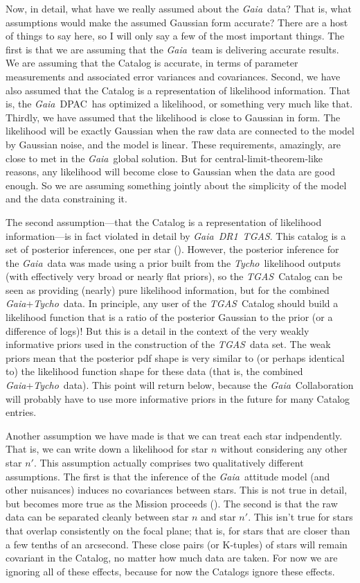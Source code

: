 \documentclass[12pt, modern]{aastex62h}
\newcommand{\acronym}[1]{{\small{#1}}}
\newcommand{\Gaia}{\textsl{Gaia}}
\newcommand{\Tycho}{\textsl{Tycho}}
\newcommand{\DRone}{\textsl{\acronym{DR1}}}
\newcommand{\TGAS}{\textsl{\acronym{TGAS}}}
\newcommand{\DPAC}{{\acronym{DPAC}}}
\begin{document}
Now, in detail, what have we really assumed about the \Gaia\ data?
That is, what assumptions would make the assumed Gaussian form accurate?
There are a host of things to say here, so I will only say a few of the
most important things.
The first is that we are assuming that the \Gaia\ team is delivering
accurate results.
We are assuming that the Catalog is accurate, in terms of parameter
measurements and associated error variances and covariances.
Second, we have also assumed that the Catalog is a representation of likelihood
information.
That is, the \Gaia\ \DPAC\ has optimized a likelihood, or something very much
like that.
Thirdly, we have assumed that the likelihood is close to Gaussian in form.
The likelihood will be exactly Gaussian when the raw data are connected
to the model by Gaussian noise, and the model is linear.
These requirements, amazingly, are close to met in the \Gaia\ global solution.
But for central-limit-theorem-like reasons, any likelihood will become close
to Gaussian when the data are good enough.
So we are assuming something jointly about the simplicity of the model and
the data constraining it.

The second assumption---that the Catalog is a representation of likelihood
information---is in fact violated in detail by \Gaia\ \DRone\ \TGAS.
This catalog is a set of posterior inferences, one per star (\citealt{michalik, dr1}).
However, the posterior inference for the \Gaia\ data was made using a prior
built from the \Tycho\ likelihood outputs (with effectively very broad
or nearly flat priors),
so the \TGAS\ Catalog can be seen as providing (nearly) pure likelihood information,
but for the combined \Gaia +\Tycho\ data.
In principle, any user of the \TGAS\ Catalog should build a likelihood function
that is a ratio of the posterior Gaussian to the prior (or a difference
of logs)!
But this is a detail in the context of the very weakly informative priors
used in the construction of the \TGAS\ data set.
The weak priors mean that the posterior pdf shape is very similar to
(or perhaps identical to) the likelihood
function shape for these data (that is, the combined \Gaia +\Tycho\ data).
This point will return below, because the \Gaia\ Collaboration will probably have to use
more informative priors in the future for many Catalog entries.

Another assumption we have made is that we can treat each star indpendently.
That is, we can write down a likelihood for star $n$ without considering any
other star $n'$.
This assumption actually comprises two qualitatively different assumptions.
The first is that the inference of the \Gaia\ attitude model (and other nuisances)
induces no covariances between stars.
This is not true in detail, but becomes more true as the Mission proceeds
(\citealt{holl}).
The second is that the raw data can be separated cleanly between star $n$ and
star $n'$.
This isn't true for stars that overlap consistently on the focal plane; that is,
for stars that are closer than a few tenths of an arcsecond.
These close pairs (or K-tuples) of stars will remain covariant in the
Catalog, no matter how much data are taken.
For now we are ignoring all of these effects, because for now the Catalogs ignore
these effects.
\end{document}
